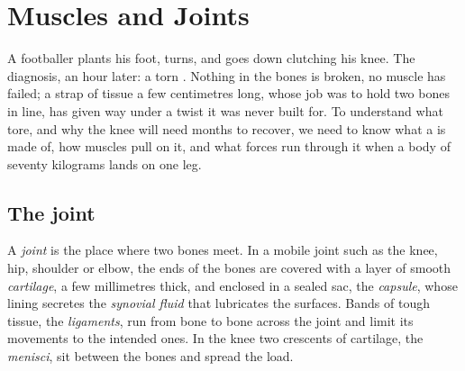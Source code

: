 \chapter{Muscles and Joints}\label{ch:g10:muscles-and-joints}

A footballer plants his foot, turns, and goes down clutching his knee.
The diagnosis, an hour later: a torn . Nothing in the bones is
broken, no muscle has failed; a strap of tissue a few centimetres long,
whose job was to hold two bones in line, has given way under a twist it
was never built for. To understand what tore, and why the knee will need
months to recover, we need to know what a  is made of, how muscles
pull on it, and what forces run through it when a body of seventy
kilograms lands on one leg.

\section{The joint}

\begin{definition}[Joint]\label{def:g10:muscles-and-joints:joint}
A \emph{joint} is the place where two bones meet. In a
mobile joint such as the knee, hip, shoulder or elbow, the ends of the
bones are covered with a layer of smooth \emph{cartilage},
a few millimetres thick, and enclosed in a sealed sac, the
\emph{capsule}, whose lining secretes the \emph{synovial fluid} that
lubricates the surfaces. Bands of tough tissue, the
\emph{ligaments}, run from bone to bone across the
joint and limit its movements to the intended ones. In the knee two
crescents of cartilage, the \emph{menisci}, sit between the bones and
spread the load.
\end{definition}

